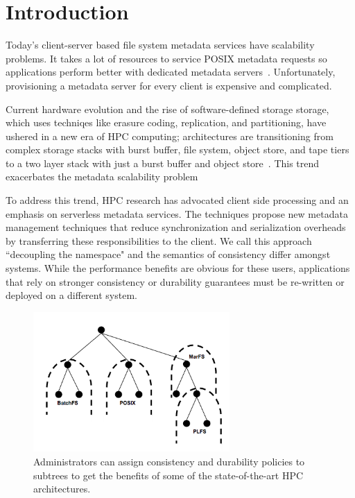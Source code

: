 \section{Introduction}

Today's client-server based file system metadata services have scalability
problems. It takes a lot of resources to service POSIX metadata requests so
applications perform better with dedicated metadata
servers~\cite{sevilla:sc15-mantle, ren:sc2014-indexfs}. Unfortunately,
provisioning a metadata server for every client is expensive and complicated.

Current hardware evolution and the rise of software-defined storage storage,
which uses techniqes like erasure coding, replication, and partitioning, have
ushered in a new era of HPC computing; architectures are transitioning from
complex storage stacks with burst buffer, file system, object store, and tape
tiers to a two layer stack with just a burst buffer and object
store~\cite{bent:login16-hpc-trends}. This trend exacerbates the metadata
scalability problem 

To address this trend, HPC research has advocated client side processing and an
emphasis on serverless metadata services.  The techniques propose new metadata
management techniques that reduce synchronization and serialization overheads
by transferring these responsibilities to the client. We call this approach
``decoupling the namespace" and the semantics of consistency differ amongst
systems.  While the performance benefits are obvious for these users,
applications that rely on stronger consistency or durability guarantees must be
re-written or deployed on a different system.  

\begin{figure}[tb]
\centering
\includegraphics[width=75mm]{figures/subtree-policies.png}
\caption{Administrators can assign consistency and durability policies to
subtrees to get the benefits of some of the state-of-the-art HPC architectures.
}\label{fig:subtree-policies}
\end{figure}

